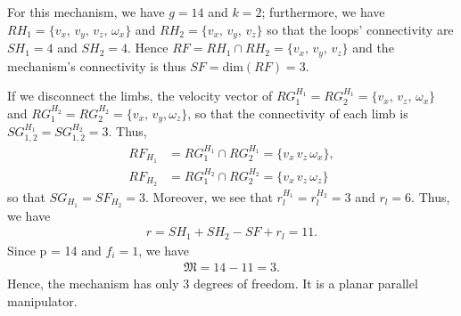 \begin{solution}
	For this mechanism, we have $g=14$ and $k=2$; furthermore, we have $RH_1 = \{v_x, \, v_y, \, v_z, \, \omega_x\}$ and $RH_2 = \{v_x,\, v_y, \, v_z \}$ so that the loops' connectivity are $SH_1 = 4$ and $SH_2 = 4$. Hence $RF = RH_1 \cap RH_2 = \{v_x, \, v_y, \, v_z\}$ and the mechanism's connectivity is thus $SF = \text{dim} (RF) = 3$.
	
	If we disconnect the limbs, the velocity vector of $RG_1^{H_1} = RG_2^{H_1} = \{v_x, \, v_z, \, \omega_x\}$ and $RG_1^{H_2} = RG_2^{H_2} = \{v_x, \, v_y, \omega_z \}$, so that the connectivity of each limb is $SG_{1,2}^{H_1} = SG_{1,2}^{H_2} = 3$. Thus,
	\begin{align}
	RF_{H_1} &= RG_1^{H_1} \cap RG_2^{H_1} = \{ v_x \, v_z \, \omega_x\}, \nonumber \\
	RF_{H_2} &= RG_1^{H_2} \cap RG_2^{H_2} = \{ v_x \, v_z \, \omega_z\}
	\end{align}
	so that $SG_{H_1} = SF_{H_2} = 3$.
	Moreover, we see that $r_l^{H_1} = r_l^{H_2} = 3$ and $r_l = 6$. Thus, we have
	\begin{align}
	r = SH_1 + SH_2 - SF + r_l = 11.
	\end{align}
	Since p = 14 and $f_i = 1$, we have 
	\begin{align}
	\mathfrak{M} = 14 - 11 = 3. 
	\end{align}
	Hence, the mechanism has only 3 degrees of freedom. It is a planar parallel manipulator.	
\end{solution}

